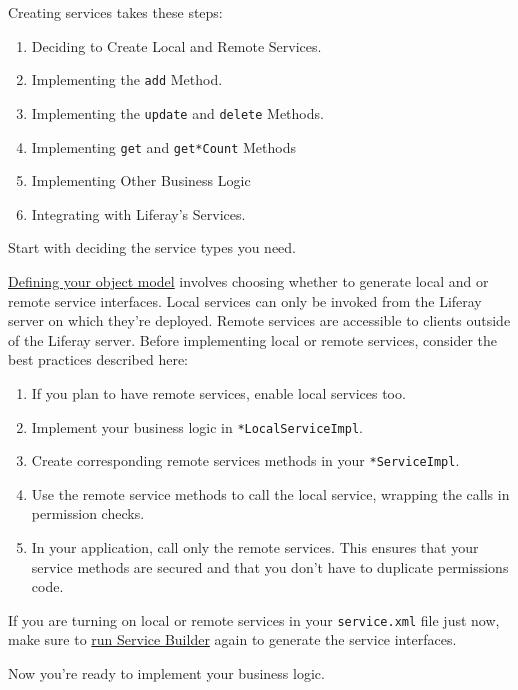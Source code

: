 Creating services takes these steps:

\begin{enumerate}
\def\labelenumi{\arabic{enumi}.}
\item
  Deciding to Create Local and Remote Services.
\item
  Implementing the \texttt{add} Method.
\item
  Implementing the \texttt{update} and \texttt{delete} Methods.
\item
  Implementing \texttt{get} and \texttt{get*Count} Methods
\item
  Implementing Other Business Logic
\item
  Integrating with Liferay's Services.
\end{enumerate}

Start with deciding the service types you need.

\href{/docs/7-2/appdev/-/knowledge_base/a/creating-the-service-xml-file}{Defining
your object model} involves choosing whether to generate local and or
remote service interfaces. Local services can only be invoked from the
Liferay server on which they're deployed. Remote services are accessible
to clients outside of the Liferay server. Before implementing local or
remote services, consider the best practices described here:

\begin{enumerate}
\def\labelenumi{\arabic{enumi}.}
\item
  If you plan to have remote services, enable local services too.
\item
  Implement your business logic in \texttt{*LocalServiceImpl}.
\item
  Create corresponding remote services methods in your
  \texttt{*ServiceImpl}.
\item
  Use the remote service methods to call the local service, wrapping the
  calls in permission checks.
\item
  In your application, call only the remote services. This ensures that
  your service methods are secured and that you don't have to duplicate
  permissions code.
\end{enumerate}

If you are turning on local or remote services in your
\texttt{service.xml} file just now, make sure to
\href{/docs/7-2/appdev/-/knowledge_base/a/running-service-builder}{run
Service Builder} again to generate the service interfaces.

Now you're ready to implement your business logic.

